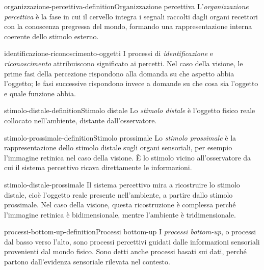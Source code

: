 \documentclass[preview]{standalone}
\begin{document}
\begin{snippetdefinition}{organizzazione-percettiva-definition}{Organizzazione percettiva}
    L'\emph{organizzazione percettiva} è la fase in cui il cervello integra i
    segnali raccolti dagli organi recettori con la conoscenza pregressa del
    mondo, formando una rappresentazione interna coerente dello stimolo esterno.
\end{snippetdefinition}

\begin{snippet}{identificazione-riconoscimento-oggetti}
    I processi di \emph{identificazione} e \emph{riconoscimento} attribuiscono
    significato ai percetti. Nel caso della visione, le prime fasi della
    percezione rispondono alla domanda su che aspetto abbia l'oggetto; le fasi
    successive rispondono invece a domande su che cosa sia l'oggetto e quale
    funzione abbia.
\end{snippet}

\begin{snippetdefinition}{stimolo-distale-definition}{Stimolo distale}
    Lo \emph{stimolo distale} è l'oggetto fisico reale collocato nell'ambiente,
    distante dall'osservatore.
\end{snippetdefinition}

\begin{snippetdefinition}{stimolo-prossimale-definition}{Stimolo prossimale}
    Lo \emph{stimolo prossimale} è la rappresentazione dello stimolo distale
    sugli organi sensoriali, per esempio l'immagine retinica nel caso della
    visione. È lo stimolo vicino all'osservatore da cui il sistema percettivo
    ricava direttamente le informazioni.
\end{snippetdefinition}

\begin{snippet}{stimolo-distale-prossimale}
    Il sistema percettivo mira a ricostruire lo stimolo distale, cioè l'oggetto
    reale presente nell'ambiente, a partire dallo stimolo prossimale. Nel caso
    della visione, questa ricostruzione è complessa perché l'immagine retinica è
    bidimensionale, mentre l'ambiente è tridimensionale.
\end{snippet}

\begin{snippetdefinition}{processi-bottom-up-definition}{Processi bottom-up}
    I \emph{processi bottom-up}, o processi dal basso verso l'alto, sono
    processi percettivi guidati dalle informazioni sensoriali provenienti dal
    mondo fisico. Sono detti anche processi basati sui dati, perché partono
    dall'evidenza sensoriale rilevata nel contesto.
\end{snippetdefinition}
\end{document}
